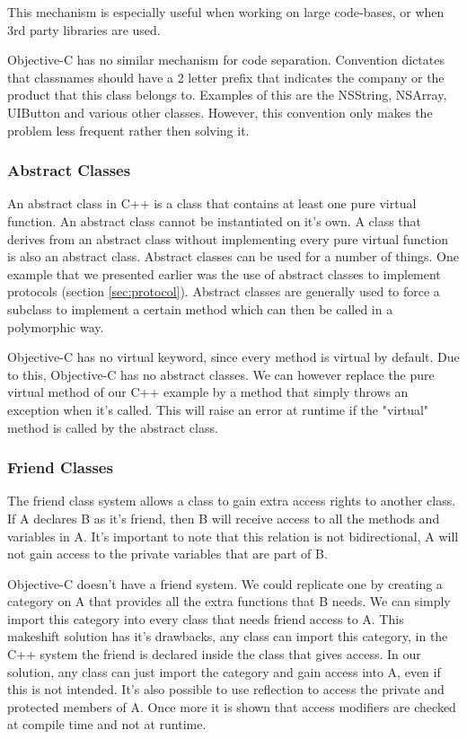 \documentclass[12pt, a4paper, twocolumn]{article}
\begin{document}
This mechanism is especially useful when working on large code-bases, or when 3rd party libraries are used.

Objective-C has no similar mechanism for code separation. Convention dictates that classnames should have a 2 letter prefix that indicates the company or the product that this class belongs to. Examples of this are the NSString, NSArray, UIButton and various other classes. However, this convention only makes the problem less frequent rather then solving it. 

\subsubsection{Abstract Classes}
\label{sec:abstract}
An abstract class in C++ is a class that contains at least one pure virtual function. An abstract class cannot be instantiated on it's own. A class that derives from an abstract class without implementing every pure virtual function is also an abstract class. Abstract classes can be used for a number of things. One example that we presented earlier was the use of abstract classes to implement protocols (section \ref{sec:protocol}). Abstract classes are generally used to force a subclass to implement a certain method which can then be called in a polymorphic way.

Objective-C has no virtual keyword, since every method is virtual by default. Due to this, Objective-C has no abstract classes. We can however replace the pure virtual method of our C++ example by a method that simply throws an exception when it's called. This will raise an error at runtime if the "virtual" method is called by the abstract class.

\subsubsection{Friend Classes}
\label{sec:friend}
The friend class system allows a class to gain extra access rights to another class. If A declares B as it's friend, then B will receive access to all the methods and variables in A. It's important to note that this relation is not bidirectional, A will not gain access to the private variables that are part of B.

Objective-C doesn't have a friend system. We could replicate one by creating a category on A that provides all the extra functions that B needs. We can simply import this category into every class that needs friend access to A. This makeshift solution has it's drawbacks, any class can import this category, in the C++ system the friend is declared inside the class that gives access. In our solution, any class can just import the category and gain access into A, even if this is not intended. It's also possible to use reflection to access the private and protected members of A. Once more it is shown that access modifiers are checked at compile time and not at runtime.
\end{document}
